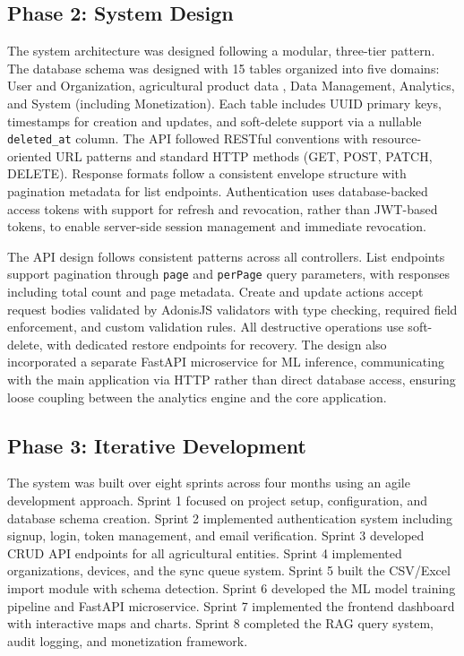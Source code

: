 \documentclass[12pt,a4paper,oneside]{report}
\begin{document}
\subsection{Phase 2: System Design}
The system architecture was designed following a modular, three-tier pattern. The database schema was designed with 15 tables organized into five domains: User and Organization, agricultural product data , Data Management, Analytics, and System (including Monetization). Each table includes UUID primary keys, timestamps for creation and updates, and soft-delete support via a nullable \texttt{deleted\_at} column. The API followed RESTful conventions with resource-oriented URL patterns and standard HTTP methods (GET, POST, PATCH, DELETE). Response formats follow a consistent envelope structure with pagination metadata for list endpoints. Authentication uses database-backed access tokens with support for refresh and revocation, rather than JWT-based tokens, to enable server-side session management and immediate revocation.

The API design follows consistent patterns across all controllers. List endpoints support pagination through \texttt{page} and \texttt{perPage} query parameters, with responses including total count and page metadata. Create and update actions accept request bodies validated by AdonisJS validators with type checking, required field enforcement, and custom validation rules. All destructive operations use soft-delete, with dedicated restore endpoints for recovery. The design also incorporated a separate FastAPI microservice for ML inference, communicating with the main application via HTTP rather than direct database access, ensuring loose coupling between the analytics engine and the core application.

\subsection{Phase 3: Iterative Development}
The system was built over eight sprints across four months using an agile development approach. Sprint 1 focused on project setup, configuration, and database schema creation. Sprint 2 implemented authentication system including signup, login, token management, and email verification. Sprint 3 developed CRUD API endpoints for all agricultural entities. Sprint 4 implemented organizations, devices, and the sync queue system. Sprint 5 built the CSV/Excel import module with schema detection. Sprint 6 developed the ML model training pipeline and FastAPI microservice. Sprint 7 implemented the frontend dashboard with interactive maps and charts. Sprint 8 completed the RAG query system, audit logging, and monetization framework.
\end{document}

